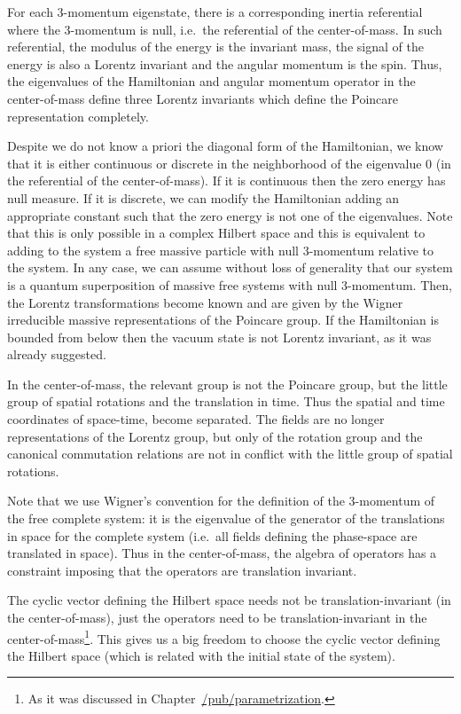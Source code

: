 \documentclass[11pt]{book}
\begin{document}
For each 3-momentum eigenstate, there is a corresponding inertia
referential where the 3-momentum is null, i.e.~the referential of the
center-of-mass. In such referential, the modulus of the energy is the
invariant mass, the signal of the energy is also a Lorentz invariant and
the angular momentum is the spin. Thus, the eigenvalues of the
Hamiltonian and angular momentum operator in the center-of-mass define
three Lorentz invariants which define the Poincare representation
completely.

Despite we do not know a priori the diagonal form of the Hamiltonian, we
know that it is either continuous or discrete in the neighborhood of the
eigenvalue 0 (in the referential of the center-of-mass). If it is
continuous then the zero energy has null measure. If it is discrete, we
can modify the Hamiltonian adding an appropriate constant such that the
zero energy is not one of the eigenvalues. Note that this is only
possible in a complex Hilbert space and this is equivalent to adding to
the system a free massive particle with null 3-momentum relative to the
system. In any case, we can assume without loss of generality that our
system is a quantum superposition of massive free systems with null
3-momentum. Then, the Lorentz transformations become known and are given
by the Wigner irreducible massive representations of the Poincare
group\cite{Wigner1939On}. If the
Hamiltonian is bounded from below then the vacuum state is not Lorentz
invariant, as it was already
suggested\cite{Segal1991Is}.

In the center-of-mass, the relevant group is not the Poincare group, but
the little group of spatial rotations and the translation in
time\cite{Wigner1939On}. Thus the
spatial and time coordinates of space-time, become separated. The fields
are no longer representations of the Lorentz group, but only of the
rotation group and the canonical commutation relations are not in
conflict with the little group of spatial rotations.

Note that we use Wigner's convention for the definition of the
3-momentum of the free complete system: it is the eigenvalue of the
generator of the translations in space for the complete system (i.e.~all
fields defining the phase-space are translated in space). Thus in the
center-of-mass, the algebra of operators has a constraint imposing that
the operators are translation invariant.

The cyclic vector defining the Hilbert space needs not be
translation-invariant (in the center-of-mass), just the operators need
to be translation-invariant in the center-of-mass\footnote{As it was
  discussed in
  Chapter~\href{https://timepiece.pubpub.org/pub/parametrization/\#gauge-transformations-constrained-systems-and-conditioned-probability}{/pub/parametrization}.}.
This gives us a big freedom to choose the cyclic vector defining the
Hilbert space (which is related with the initial state of the system).
\end{document}
